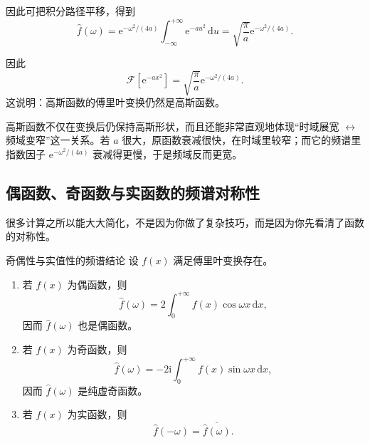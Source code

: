 \begin{lizi}{}{}
\begin{jie}
因此可把积分路径平移，得到
\begin{equation}
    \hat{f}(\omega)
    =
    \mathrm{e}^{-\omega^2/(4a)}
    \int_{-\infty}^{+\infty}
    \mathrm{e}^{-a u^2}\,\mathrm{d}u
    =
    \sqrt{\frac{\pi}{a}}\mathrm{e}^{-\omega^2/(4a)}.
\end{equation}

因此
\begin{equation}
    \boxed{
        \mathcal{F}[\mathrm{e}^{-ax^2}]
        =
        \sqrt{\frac{\pi}{a}}\mathrm{e}^{-\omega^2/(4a)}
    }.
\end{equation}
这说明：高斯函数的傅里叶变换仍然是高斯函数。
\end{jie}
\end{lizi}

\begin{tishi}[为什么这个结果特别值得记]
高斯函数不仅在变换后仍保持高斯形状，而且还能非常直观地体现``时域展宽 $\leftrightarrow$ 频域变窄''这一关系。若 $a$ 很大，原函数衰减很快，在时域里较窄；而它的频谱里指数因子 $\mathrm{e}^{-\omega^2/(4a)}$ 衰减得更慢，于是频域反而更宽。
\end{tishi}

\subsection{偶函数、奇函数与实函数的频谱对称性}

很多计算之所以能大大简化，不是因为你做了复杂技巧，而是因为你先看清了函数的对称性。

\begin{dingli}{奇偶性与实值性的频谱结论}{}
设 $f(x)$ 满足傅里叶变换存在。
\begin{enumerate}
    \item 若 $f(x)$ 为偶函数，则
    \begin{equation}
        \hat{f}(\omega)=2\int_{0}^{+\infty} f(x)\cos \omega x\,\mathrm{d}x,
    \end{equation}
    因而 $\hat{f}(\omega)$ 也是偶函数。
    \item 若 $f(x)$ 为奇函数，则
    \begin{equation}
        \hat{f}(\omega)=-2\mathrm{i}\int_{0}^{+\infty} f(x)\sin \omega x\,\mathrm{d}x,
    \end{equation}
    因而 $\hat{f}(\omega)$ 是纯虚奇函数。
    \item 若 $f(x)$ 为实函数，则
    \begin{equation}
        \hat{f}(-\omega)=\overline{\hat{f}(\omega)}.
    \end{equation}
\end{enumerate}
\end{dingli}

